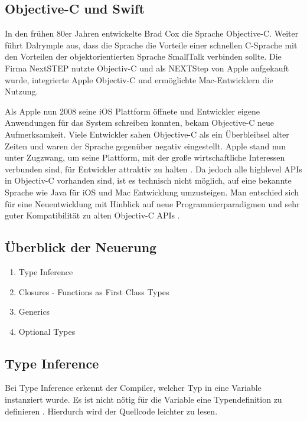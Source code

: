 \subsection{Objective-C und Swift}
In den frühen 80er Jahren entwickelte Brad Cox die Sprache Objective-C\cite{Dalrymple:2009aa}. Weiter führt Dalrymple aus, dass die Sprache  die Vorteile einer schnellen C-Sprache mit den Vorteilen der objektorientierten Sprache SmallTalk verbinden sollte. Die Firma NextSTEP nutzte Objectiv-C und als NEXTStep von Apple aufgekauft wurde, integrierte Apple Objectiv-C und ermöglichte Mac-Entwicklern die Nutzung.

 Als Apple nun 2008 seine iOS Plattform öffnete und Entwickler eigene Anwendungen für das System schreiben konnten, bekam Objective-C neue Aufmerksamkeit. Viele Entwickler sahen Objective-C als ein Überbleibsel alter Zeiten und waren der Sprache gegenüber negativ eingestellt. Apple stand nun unter Zugzwang, um seine Plattform, mit der große wirtschaftliche Interessen verbunden sind, für Entwickler attraktiv zu halten \cite{Wells:2015fu}. Da jedoch alle highlevel APIs in Objectiv-C vorhanden sind, ist es technisch nicht möglich, auf eine bekannte Sprache wie Java für iOS und Mac Entwicklung umzusteigen. Man entschied sich für eine Neuentwicklung mit Hinblick auf neue Programmierparadigmen und sehr guter Kompatibilität zu alten Objectiv-C APIs \cite{Wells:2015fu}.

\subsection{Überblick der Neuerung}
\begin{enumerate}
\item Type Inference
\item Closures - Functions as First Class Types
\item Generics
\item Optional Types
\end{enumerate}

\subsection{Type Inference}
Bei Type Inference erkennt der Compiler, welcher Typ in eine Variable instanziert wurde. Es ist nicht nötig für die Variable eine Typendefinition zu definieren \cite{Apple:2014sp}. Hierdurch wird der Quellcode leichter zu lesen. 



